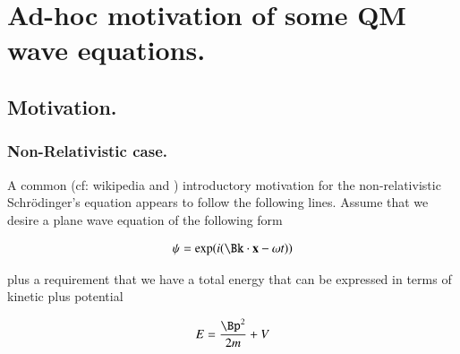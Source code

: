 
%
%



\chapter{Ad-hoc motivation of some QM wave equations. }
\label{chap:sch}
\date{ Dec 13, 2008.  $RCSfile: sch.tex,v $ Last $Revision: 1.11 $ $Date: 2009/06/14 23:51:45 $ }

%



\section{Motivation. }

\subsection{Non-Relativistic case. }

A common (cf: wikipedia and \cite{french1998iqp}) introductory motivation for the non-relativistic Schr\"{o}dinger's equation appears to follow the following lines.  Assume that
we desire a plane wave equation of the following form

\begin{align*}
\psi = \exp(i (\Bk \cdot \Bx - \omega t))
\end{align*}

plus a requirement that we have a total energy that can be expressed in terms of kinetic plus potential

\begin{align}\label{eqn:sch:energy}
E = \frac{\Bp^2}{2m} + V
\end{align}

